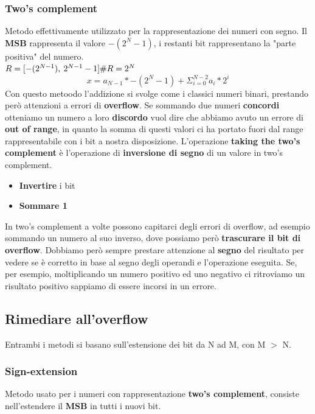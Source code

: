 \documentclass{report}
\begin{document}
        \subsubsection{Two's complement}
            Metodo effettivamente utilizzato per la rappresentazione dei numeri con segno.
            Il \textbf{MSB} rappresenta il valore $-(2^N-1)$, i restanti bit rappresentano 
            la "parte positiva" del numero. \\
            $R = [-(2^{N-1}), \: 2^{N-1} - 1] \\
            \#R = 2^N
            $ \\
            $$ x = a_{N-1} * -(2^N-1) + \Sigma_{i = 0}^{N-2} a_i * 2^i $$
            Con questo metoodo l'addizione si svolge come i classici numeri binari, 
            prestando però attenzioni a errori di \textbf{overflow}.
            Se sommando due numeri \textbf{concordi} otteniamo un numero a loro \textbf{discordo}
            vuol dire che abbiamo avuto un errore di \textbf{out of range}, in quanto la somma
            di questi valori ci ha portato fuori dal range rappresentabile con i bit a nostra
            disposizione.
            L'operazione \textbf{taking the two's complement} è l'operazione di
            \textbf{inversione di segno} di un valore in two's complement.
            \begin{itemize}
                \item \textbf{Invertire} i bit
                \item \textbf{Sommare 1}
            \end{itemize}
            In two's complement a volte possono capitarci degli errori di overflow, ad 
            esempio sommando un numero al suo inverso, dove possiamo però \textbf{trascurare 
            il bit di overflow}. Dobbiamo però sempre prestare attenzione al 
            \textbf{segno} del risultato per vedere se è corretto in base al segno 
            degli operandi e l'operazione eseguita. Se, per esempio, moltiplicando
            un numero positivo ed uno negativo ci ritroviamo un risultato positivo
            sappiamo di essere incorsi in un errore.
    \subsection{Rimediare all'overflow}
        Entrambi i metodi si basano sull'estensione dei bit da N ad M, con M $>$ N.
        \subsubsection{Sign-extension}
            Metodo usato per i numeri con rappresentazione \textbf{two's complement},
            consiste nell'estendere il \textbf{MSB} in tutti i nuovi bit.
\end{document}
